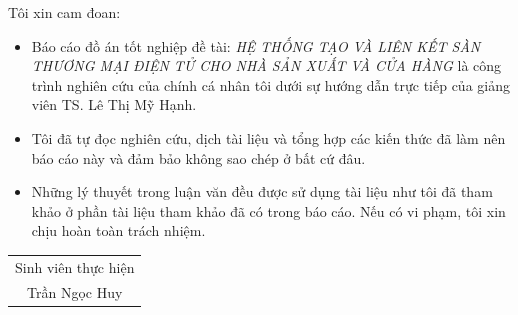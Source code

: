 \documentclass[11pt]{report}
\newcommand{\project}{HỆ THỐNG TẠO VÀ LIÊN KẾT SÀN THƯƠNG MẠI ĐIỆN TỬ CHO NHÀ SẢN XUẤT VÀ CỬA HÀNG}
\newcommand{\me}{Trần Ngọc Huy}
\newcommand{\advisor}{TS. Lê Thị Mỹ Hạnh}
\renewcommand{\listtablename}{Danh sách các bảng, hình vẽ}
\begin{document}
	Tôi xin cam đoan:
	\begin{itemize}
		\item Báo cáo đồ án tốt nghiệp đề tài: \emph{\project} là công trình nghiên cứu của chính cá nhân tôi dưới sự hướng dẫn trực tiếp của giảng viên \advisor.
		\item Tôi đã tự đọc nghiên cứu, dịch tài liệu và tổng hợp các kiến thức đã làm nên báo cáo này và đảm bảo không sao chép ở bất cứ đâu.
		\item Những lý thuyết trong luận văn đều được sử dụng tài liệu như tôi đã tham khảo ở phần tài liệu tham khảo đã có trong báo cáo. Nếu có vi phạm, tôi xin chịu hoàn toàn trách nhiệm.
	\end{itemize}
	
	\vspace{1cm}
	
	\hspace*{\fill}
	\begin{tabular}{c}  %
		{\large Sinh viên thực hiện}
		\vspace{3cm}\\
		\me
	\end{tabular}
	
	
	


	



	\fontsize{13px}{13px}\selectfont
	\renewcommand*\contentsname{MỤC LỤC}
	\cleardoublepage
	\tableofcontents

	
	\renewcommand{\listfigurename}{DANH SÁCH HÌNH VẼ}
	\renewcommand{\listtablename}{DANH SÁCH BẢNG}
	\listoffigures
	\listoftables
	
	\printglossary[title=DANH SÁCH TỪ VIẾT TẮT, toctitle=DANH SÁCH TỪ VIẾT TẮT]
	
\end{document}
